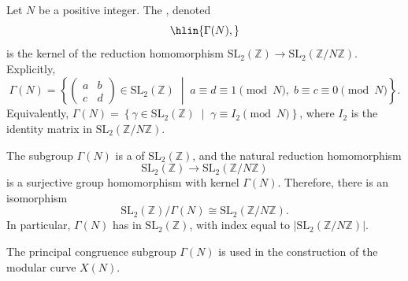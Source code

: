 \begin{definition} \label{definition:principal_congruence_subgroup_Gamma_N_of_SL_2_Z}
    Let $N$ be a positive integer. The , denoted
    $$\hlin{\Gamma(N),}$$
    is the kernel of the reduction homomorphism $\mathrm{SL}_2(\mathbb{Z}) \to \mathrm{SL}_2(\mathbb{Z}/N\mathbb{Z})$. Explicitly,
    $$\Gamma(N) = \left\{ \begin{pmatrix} a & b \\ c & d \end{pmatrix} \in \mathrm{SL}_2(\mathbb{Z}) \;\middle|\; a \equiv d \equiv 1 \pmod{N},\; b \equiv c \equiv 0 \pmod{N} \right\}.$$
    Equivalently, $\Gamma(N) = \left\{ \gamma \in \mathrm{SL}_2(\mathbb{Z}) \;\middle|\; \gamma \equiv I_2 \pmod{N} \right\}$, where $I_2$ is the identity matrix in $\mathrm{SL}_2(\mathbb{Z}/N\mathbb{Z})$.

    The subgroup $\Gamma(N)$ is a  of $\mathrm{SL}_2(\mathbb{Z})$, and the natural reduction homomorphism
    $$\mathrm{SL}_2(\mathbb{Z}) \longrightarrow \mathrm{SL}_2(\mathbb{Z}/N\mathbb{Z})$$
    is a surjective group homomorphism with kernel $\Gamma(N)$. Therefore, there is an isomorphism
    $$\mathrm{SL}_2(\mathbb{Z}) / \Gamma(N) \cong \mathrm{SL}_2(\mathbb{Z}/N\mathbb{Z}).$$
    In particular, $\Gamma(N)$ has  in $\mathrm{SL}_2(\mathbb{Z})$, with index equal to $|\mathrm{SL}_2(\mathbb{Z}/N\mathbb{Z})|$.

    The principal congruence subgroup $\Gamma(N)$ is used in the construction of the modular curve $X(N)$.
\end{definition}